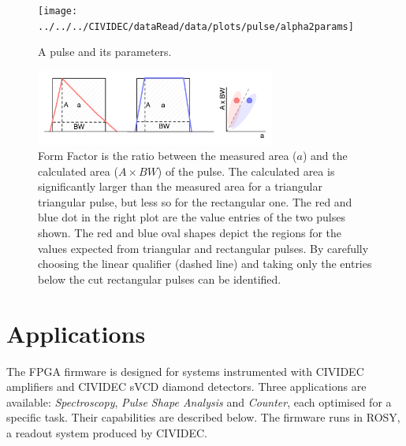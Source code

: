 \begin{figure}[!t]
\centering
\texttt{[image: ../../../CIVIDEC/dataRead/data/plots/pulse/alpha2params]}
\caption{A pulse and its parameters.}
\label{fig:params}
\end{figure}


\begin{figure}[!t]
\centering
\includegraphics[width=0.7\textwidth]{05_current_monitoring/plots/formfac1}
\caption{Form Factor is the ratio between the measured area ($a$) and the calculated area ($A\times BW$) of the pulse. The calculated area is significantly larger than the measured area for a triangular triangular pulse, but less so for the rectangular one. The red and blue dot in the right plot are the value entries of the two pulses shown. The red and blue oval shapes depict the regions for the values expected from triangular and rectangular pulses. By carefully choosing the linear qualifier (dashed line) and taking only the entries below the cut rectangular pulses can be identified.}
\label{fig:formfac1}
\end{figure}



\section{Applications}
\label{sec:applications}

The FPGA firmware is designed for systems instrumented with CIVIDEC amplifiers and CIVIDEC sVCD diamond detectors. Three applications are available: \emph{Spectroscopy}, \emph{Pulse Shape Analysis} and \emph{Counter}, each optimised for a specific task. Their capabilities are described below. The firmware runs in ROSY, a readout system produced by CIVIDEC.


